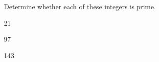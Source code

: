 
%
%
%

	Determine whether each of these integers is prime.
	\begin{subproblem}
		\item 21
		\skipitem 
		\skipitem 
		\item 97
		\skipitem 
		\item 143
	\end{subproblem}

\solution
	\begin{subproblem}
		\item 
		\skipitem 
		\skipitem 
		\item 
		\skipitem 
		\item 
	\end{subproblem}
